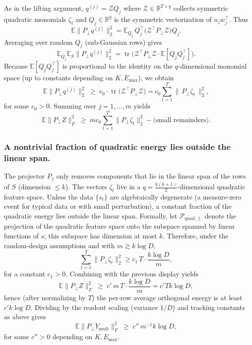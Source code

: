 \documentclass[sigconf,screen]{acmart}
\begin{document}
As in the lifting argument, \(q^{(j)} = \mathcal Z Q_j\) where \(\mathcal Z\in\mathbb R^{T\times q}\) collects symmetric quadratic monomials \(\zeta_t\) and \(Q_j\in\mathbb R^q\) is the symmetric vectorization of \(u_j w_j^\top\). Thus
\[
\mathbb E\|P_\perp q^{(j)}\|_2^2
= \mathbb E_{Q_j}\, Q_j^\top \big(\mathcal Z^\top P_\perp \mathcal Z\big) Q_j.
\]
Averaging over random \(Q_j\) (sub-Gaussian rows) gives
\[
\mathbb E_{Q_j}\mathbb E_{S}\|P_\perp q^{(j)}\|_2^2
= \operatorname{tr}\big(\mathcal Z^\top P_\perp \mathcal Z\cdot \mathbb E[Q_j Q_j^\top]\big).
\]
Because \(\mathbb E[Q_j Q_j^\top]\) is proportional to the identity on the \(q\)-dimensional monomial space (up to constants depending on \(K,E_{\max}\)), we obtain
\[
\mathbb E\|P_\perp q^{(j)}\|_2^2 \;\ge\; c_0\cdot \operatorname{tr}\big(\mathcal Z^\top P_\perp \mathcal Z\big)
= c_0\sum_{t=1}^T \|\,P_\perp \zeta_t\,\|_2^2,
\]
for some \(c_0>0\). Summing over \(j=1,\dots,m\) yields
\[
\mathbb E\|P_\perp Z\|_F^2 \;\ge\; m c_0 \sum_{t=1}^T \|P_\perp\zeta_t\|_2^2 - \text{(small remainders)}.
\]

\subsubsection*{\bf A nontrivial fraction of quadratic energy lies outside the linear span.}  
The projector \(P_\parallel\) only removes components that lie in the linear span of the rows of \(S\) (dimension \(\le k\)). The vectors \(\zeta_t\) live in a \(q=\tfrac{k(k+1)}{2}\)-dimensional quadratic feature space. Unless the data \(\{s_t\}\) are algebraically degenerate (a measure-zero event for typical data or with small perturbation), a constant fraction of the quadratic energy lies outside the linear span. Formally, let \(\mathcal P_{\mathrm{quad},\parallel}\) denote the projection of the quadratic feature space onto the subspace spanned by linear functions of \(s\); this subspace has dimension at most \(k\). Therefore, under the random-design assumptions and with \(m\gtrsim k\log D\),
\[
\sum_{t=1}^T \|P_\perp\zeta_t\|_2^2
\ge
c_1\, T \cdot \frac{k\log D}{m},
\]
for a constant \(c_1>0\). Combining with the previous display yields
\[
\mathbb E\|P_\perp Z\|_F^2 \;\ge\; c' \, m\, T\cdot \frac{k\log D}{m} = c' T k\log D,
\]
hence (after normalizing by \(T\)) the per-row average orthogonal energy is at least \(c' k\log D\). Dividing by the readout scaling (variance \(1/D\)) and tracking constants as above gives
\[
\mathbb E\|P_\perp Y_{\mathrm{mult}}\|_F^2 \;\ge\; c''\, m^{-1} k\log D,
\]
for some \(c''>0\) depending on \(K,E_{\max}\).
\end{document}

